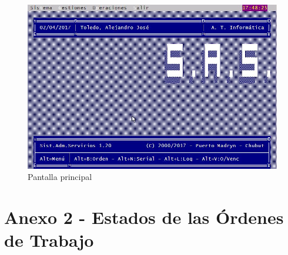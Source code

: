 \documentclass[12pt]{extarticle}
\begin{document}
    \begin{figure}[h]
    \includegraphics[scale=0.5]{images/pantalla_principal.jpg}
    \caption{Pantalla principal}
    \end{figure}

\section{Anexo 2 - Estados de las Órdenes de Trabajo}
\end{document}
